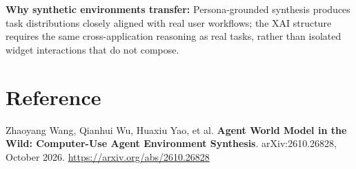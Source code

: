 \documentclass[10pt,twocolumn]{article}
\begin{document}
\textbf{Why synthetic environments transfer:} Persona-grounded synthesis
produces task distributions closely aligned with real user workflows; the
XAI structure requires the same cross-application reasoning as real tasks,
rather than isolated widget interactions that do not compose.

\section*{Reference}

Zhaoyang Wang, Qianhui Wu, Huaxiu Yao, et al.
\textbf{Agent World Model in the Wild: Computer-Use Agent Environment Synthesis}.
arXiv:2610.26828, October 2026.
\url{https://arxiv.org/abs/2610.26828}
\end{document}
